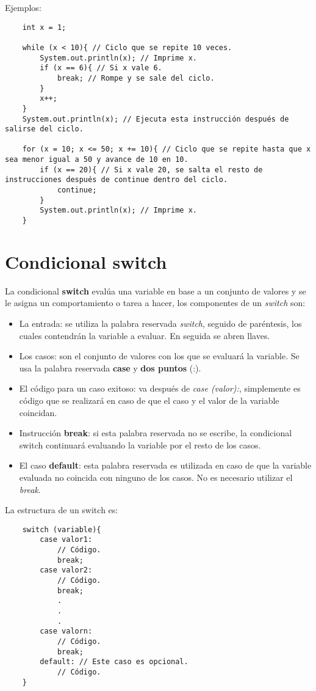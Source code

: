 Ejemplos:
\begin{lstlisting}
    int x = 1;
    
    while (x < 10){ // Ciclo que se repite 10 veces.
        System.out.println(x); // Imprime x.
        if (x == 6){ // Si x vale 6.
            break; // Rompe y se sale del ciclo.
        }
        x++;
    }  
    System.out.println(x); // Ejecuta esta instrucción después de salirse del ciclo.
    
    for (x = 10; x <= 50; x += 10){ // Ciclo que se repite hasta que x sea menor igual a 50 y avance de 10 en 10.
        if (x == 20){ // Si x vale 20, se salta el resto de instrucciones después de continue dentro del ciclo.
            continue;
        }
        System.out.println(x); // Imprime x.
    }
\end{lstlisting}



\section{Condicional switch}

La condicional \textbf{switch} evalúa una variable en base a un conjunto de valores y se le asigna un comportamiento o tarea a hacer, los componentes de un \textit{switch} son:
\begin{itemize}
    \item La entrada: se utiliza la palabra reservada \textit{switch}, seguido de paréntesis, los cuales contendrán la variable a evaluar. En seguida se abren llaves.
    \item Los casos: son el conjunto de valores con los que se evaluará la variable. Se usa la palabra reservada \textbf{case} y \textbf{dos puntos} (:).
    \item El código para un caso exitoso: va después de \textit{case (valor):}, simplemente es código que se realizará en caso de que el caso y el valor de la variable coincidan.
    \item Instrucción \textbf{break}: si esta palabra reservada no se escribe, la condicional switch continuará evaluando la variable por el resto de los casos.
    \item El caso \textbf{default}: esta palabra reservada es utilizada en caso de que la variable evaluada no coincida con ninguno de los casos. No es necesario utilizar el \textit{break}.
\end{itemize}

La estructura de un switch es:
\begin{lstlisting}
    switch (variable){
        case valor1:
            // Código.
            break;
        case valor2:
            // Código.
            break;
            .
            .
            .
        case valorn:
            // Código.
            break;
        default: // Este caso es opcional.
            // Código.
    }
\end{lstlisting}


